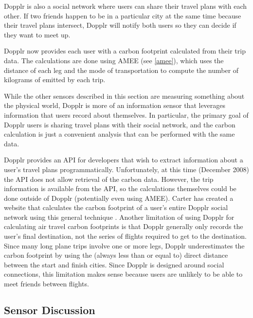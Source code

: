 Dopplr is also a social network where users can share their travel plans with each other. If two friends happen to be in a particular city at the same time because their travel plans intersect, Dopplr will notify both users so they can decide if they want to meet up.

Dopplr now provides each user with a carbon footprint calculated from their trip data. The calculations are done using AMEE (see \autoref{amee}), which uses the distance of each leg and the mode of transportation to compute the number of kilograms of \COtwo emitted by each trip.

While the other sensors described in this section are measuring something about the physical world, Dopplr is more of an information sensor that leverages information that users record about themselves. In particular, the primary goal of Dopplr users is sharing travel plans with their social network, and the carbon calculation is just a convenient analysis that can be performed with the same data.

Dopplr provides an API for developers that wish to extract information about a user's travel plans programmatically. Unfortunately, at this time (December 2008) the API does not allow retrieval of the carbon data. However, the trip information is available from the API, so the calculations themselves could be done outside of Dopplr (potentially even using AMEE). Carter has created a website that calculates the carbon footprint of a user's entire Dopplr social network using this general technique \cite{offsetr-website}. Another limitation of using Dopplr for calculating air travel carbon footprints is that Dopplr generally only records the user's final destination, not the series of flights required to get to the destination. Since many long plane trips involve one or more legs, Dopplr underestimates the carbon footprint by using the (always less than or equal to) direct distance between the start and finish cities. Since Dopplr is designed around social connections, this limitation makes sense because users are unlikely to be able to meet friends between flights.

\subsection{Sensor Discussion}

